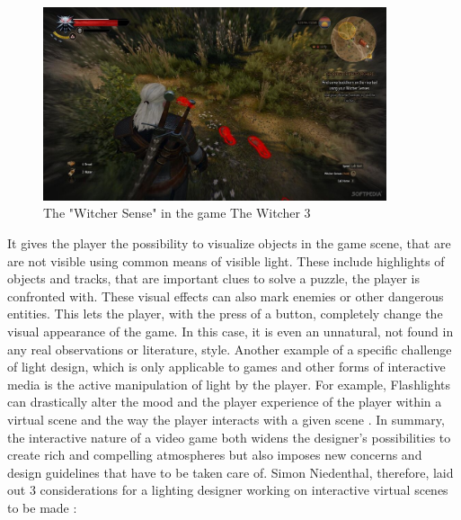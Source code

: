 \begin{figure}[h]
	\centering
		\includegraphics[width=0.9\textwidth]{Bilder/The-Witcher-3-Diary-Witcher-Contracts-Are-Quite-Fun-482236-2.jpg}
	\caption{The "Witcher Sense" in the game The Witcher 3 \cite{witchersenses}}
	\label{fig:witcher}
\end{figure}

It gives the player the possibility to visualize objects in the game scene, that are are not visible using common means of visible light. These include highlights of objects and tracks, that are important clues to solve a puzzle, the player is confronted with. These visual effects can also mark enemies or other dangerous entities. This lets the player, with the press of a button, completely change the visual appearance of the game. In this case, it is even an unnatural, not found in any real observations or literature, style. Another example of a specific challenge of light design, which is only applicable to games and other forms of interactive media is the active manipulation of light by the player. For example, Flashlights can drastically alter the mood and the player experience of the player within a virtual scene and the way the player interacts with a given scene \cite{Shadowplay}.
\newpage
In summary, the interactive nature of a video game both widens the designer's possibilities to create rich and compelling atmospheres but also imposes new concerns and design guidelines that have to be taken care of. Simon Niedenthal, therefore, laid out 3 considerations for a lighting designer working on interactive virtual scenes to be made \cite{Shadowplay}: 

